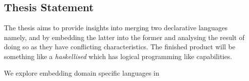 \begin{unbcabstract}
\section{Thesis Statement}

The thesis aims to provide insights into merging two declarative languages namely,  and  by embedding 
the latter into the former and analysing the result of doing so as they have conflicting characteristics. The finished product will be 
something like a \textit{haskellised}  which has logical programming like capabilities.       

We explore embedding domain specific languages in  

       
\end{unbcabstract}

